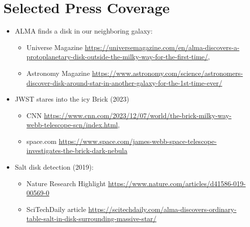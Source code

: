 
\setlength{\extrarowheight}{7pt}

\section*{Selected Press Coverage}

\begin{itemize}
    \item ALMA finds a disk in our neighboring galaxy: 
        \begin{itemize}
            \item Universe Magazine \url{https://universemagazine.com/en/alma-discovers-a-protoplanetary-disk-outside-the-milky-way-for-the-first-time/},
            \item Astronomy Magazine \url{https://www.astronomy.com/science/astronomers-discover-disk-around-star-in-another-galaxy-for-the-1st-time-ever/}
        \end{itemize}
    \item JWST stares into the icy Brick (2023)
        \begin{itemize}
            \item CNN \url{https://www.cnn.com/2023/12/07/world/the-brick-milky-way-webb-telescope-scn/index.html},
            \item space.com \url{https://www.space.com/james-webb-space-telescope-investigates-the-brick-dark-nebula}
        \end{itemize}
    \item Salt disk detection (2019):
        \begin{itemize}
            \item Nature Research Highlight \url{https://www.nature.com/articles/d41586-019-00569-0}
            \item SciTechDaily article \url{https://scitechdaily.com/alma-discovers-ordinary-table-salt-in-disk-surrounding-massive-star/}
        \end{itemize}
\end{itemize}
